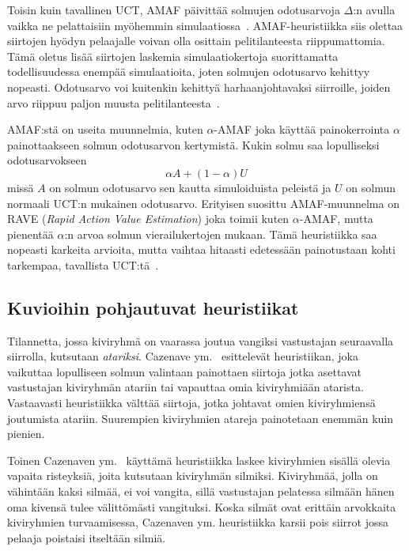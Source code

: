 \documentclass[12pt,finnish]{tktltiki2}
\theoremstyle{definition}
\theoremstyle{remark}
\begin{document}
Toisin kuin tavallinen UCT, AMAF päivittää solmujen odotusarvoja $\Delta$:n avulla vaikka ne pelattaisiin myöhemmin simulaatiossa~\cite{browne, helmbold}. AMAF-heuristiikka siis olettaa siirtojen hyödyn pelaajalle voivan olla osittain pelitilanteesta riippumattomia. Tämä oletus lisää siirtojen laskemia simulaatiokertoja suorittamatta todellisuudessa enempää simulaatioita, joten solmujen odotusarvo kehittyy nopeasti. Odotusarvo voi kuitenkin kehittyä harhaanjohtavaksi siirroille, joiden arvo riippuu paljon muusta pelitilanteesta~\cite{helmbold}.

AMAF:stä on useita muunnelmia, kuten $\alpha$-AMAF joka käyttää painokerrointa $\alpha$ painottaakseen solmun odotusarvon kertymistä. Kukin solmu saa lopulliseksi odotusarvokseen
\begin{equation}
\alpha A + (1 - \alpha)U
\end{equation}
missä $A$ on solmun odotusarvo sen kautta simuloiduista peleistä ja $U$ on solmun normaali UCT:n mukainen odotusarvo. Erityisen suosittu AMAF-muunnelma on RAVE (\textit{Rapid Action Value Estimation}) joka toimii kuten $\alpha$-AMAF, mutta pienentää $\alpha$:n arvoa solmun vierailukertojen mukaan. Tämä heuristiikka saa nopeasti karkeita arvioita, mutta vaihtaa hitaasti edetessään painotustaan kohti tarkempaa, tavallista UCT:tä~\cite{browne}.

\subsection{Kuvioihin pohjautuvat heuristiikat}

Tilannetta, jossa kiviryhmä on vaarassa joutua vangiksi vastustajan seuraavalla siirrolla, kutsutaan \textit{atariksi}. Cazenave ym.~\cite{cazenaveatari} esittelevät heuristiikan, joka vaikuttaa lopulliseen solmun valintaan painottaen siirtoja jotka asettavat vastustajan kiviryhmän atariin tai vapauttaa omia kiviryhmiään atarista. Vastaavasti heuristiikka välttää siirtoja, jotka johtavat omien kiviryhmiensä joutumista atariin. Suurempien kiviryhmien atareja painotetaan enemmän kuin pienien.

Toinen Cazenaven ym.~\cite{cazenave} käyttämä heuristiikka laskee kiviryhmien sisällä olevia vapaita risteyksiä, joita kutsutaan kiviryhmän silmiksi. Kiviryhmää, jolla on vähintään kaksi silmää, ei voi vangita, sillä vastustajan pelatessa silmään hänen oma kivensä tulee välittömästi vangituksi. Koska silmät ovat erittäin arvokkaita kiviryhmien turvaamisessa, Cazenaven ym. heuristiikka karsii pois siirrot jossa pelaaja poistaisi itseltään silmiä.
\end{document}
